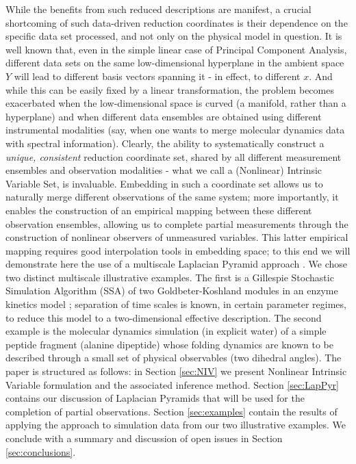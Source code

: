 \documentclass[twocolumn]{revtex4}
\begin{document}
%
While the benefits from such reduced descriptions are manifest, a crucial shortcoming of
such data-driven reduction coordinates is their dependence on the specific data set processed,
and not only on the physical model in question.
%
It is well known that, even in the simple linear case of Principal Component Analysis,
different data sets on the same low-dimensional hyperplane in the ambient space $Y$
will lead to different basis vectors spanning it - in effect, to different $x$.
%
And while this can be easily fixed by a linear transformation, the problem becomes
exacerbated when the low-dimensional space is curved (a manifold, rather than a hyperplane)
and when different data ensembles are obtained using different instrumental modalities
(say, when one wants to merge molecular dynamics data with spectral information).
%
Clearly, the ability to systematically construct a {\em unique, consistent} reduction
coordinate set, shared by all different measurement ensembles and observation modalities -
what we call a (Nonlinear) Intrinsic Variable Set, is invaluable.
%
Embedding in such a coordinate set allows us to naturally merge different observations of the same system;
more importantly, it enables the construction of an empirical mapping between these different
observation ensembles, allowing us to complete partial measurements through the construction
of nonlinear observers of unmeasured variables.
%
This latter empirical mapping requires good interpolation tools in embedding space; to this
end we will demonstrate here the use of a multiscale Laplacian Pyramid approach \cite{rabin2012heterogeneous}.
%
We chose two distinct multiscale illustrative examples. The first is a Gillespie Stochastic Simulation
Algorithm (SSA)  of two Goldbeter-Koshland modules in an enzyme kinetics model \cite{zagaris2012stability}; separation of time scales is known,
in certain parameter regimes, to reduce this model to a two-dimensional effective description.
The second example is the molecular dynamics
simulation (in explicit water) of a simple peptide fragment (alanine dipeptide) whose folding
dynamics are known to be described through a small set of physical observables (two dihedral angles).
%
The paper is structured as follows: in Section \ref{sec:NIV} we present Nonlinear Intrinsic Variable formulation and
the associated inference method. Section \ref{sec:LapPyr} contains our discussion of Laplacian Pyramids that
will be used for the completion of partial observations. Section \ref{sec:examples} contain the results
of applying the approach to simulation data from our two illustrative examples. We conclude with
a summary and discussion of open issues in Section \ref{sec:conclusions}.
\end{document}
